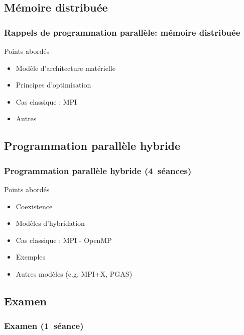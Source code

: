 \documentclass{beamer}
\begin{document}
\begin{frame}
\subsection{Mémoire distribuée}
\frametitle{Rappels de programmation parallèle: mémoire distribuée}
Points abordés
\begin{itemize}
\item Modèle d'architecture matérielle
\item Principes d'optimisation
\item Cas classique : MPI
\item Autres
\end{itemize}
\end{frame}

\begin{frame}
\section{Programmation parallèle hybride}
\frametitle{Programmation parallèle hybride \hbox{(4 séances)}}
Points abordés
\begin{itemize}
\item Coexistence 
\item Modèles d'hybridation
\item Cas classique : MPI - OpenMP
\item Exemples
\item Autres modèles (e.g. MPI+X, PGAS)
\end{itemize}
\end{frame}

\begin{frame}
\section{Examen}
\frametitle{Examen \hbox{(1 séance)}}
\end{frame}
\end{document}
